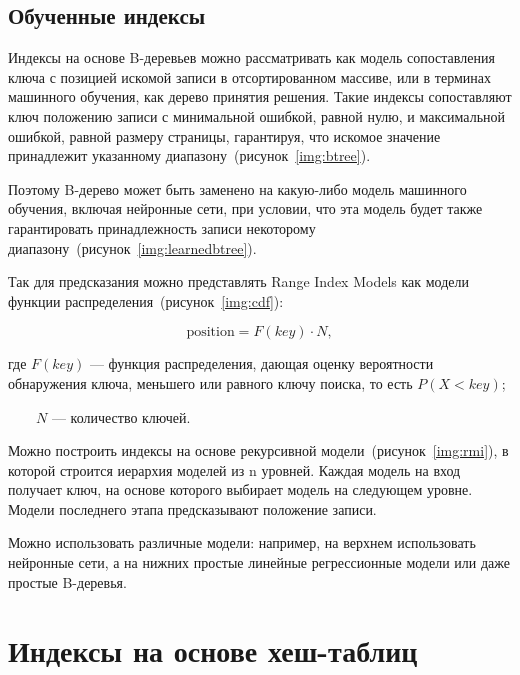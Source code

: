 \subsection{Обученные индексы}

Индексы на основе B-деревьев можно рассматривать как модель сопоставления ключа
с позицией искомой записи в отсортированном массиве, или в терминах машинного
обучения, как дерево принятия решения. Такие индексы сопоставляют ключ положению
записи с минимальной ошибкой, равной нулю, и максимальной ошибкой, равной
размеру страницы, гарантируя, что искомое значение принадлежит указанному
диапазону~(рисунок~\ref{img:btree}). 


Поэтому B-дерево может быть заменено на какую-либо модель машинного обучения,
включая нейронные сети, при условии, что эта модель будет также гарантировать
принадлежность записи некоторому диапазону~(рисунок~\ref{img:learnedbtree}).


Так для предсказания можно представлять Range Index Models как модели функции
распределения~(рисунок~\ref{img:cdf}):

\begin{equation}
    \text{position} = F(key) \cdot N,
\end{equation}

где $F(key)$ --- функция распределения, дающая оценку вероятности обнаружения
ключа, меньшего или равного ключу поиска, то есть $P(X < key)$;

~~~~$N$ --- количество ключей.


Можно построить индексы на основе рекурсивной
модели~(рисунок~\ref{img:rmi}), в которой строится иерархия моделей из n
уровней. Каждая модель на вход получает ключ, на основе которого выбирает модель
на следующем уровне. Модели последнего этапа предсказывают положение записи.


Можно использовать различные модели: например, на верхнем использовать нейронные
сети, а на нижних простые линейные регрессионные модели или даже простые
B-деревья.

\section{Индексы на основе хеш-таблиц}

